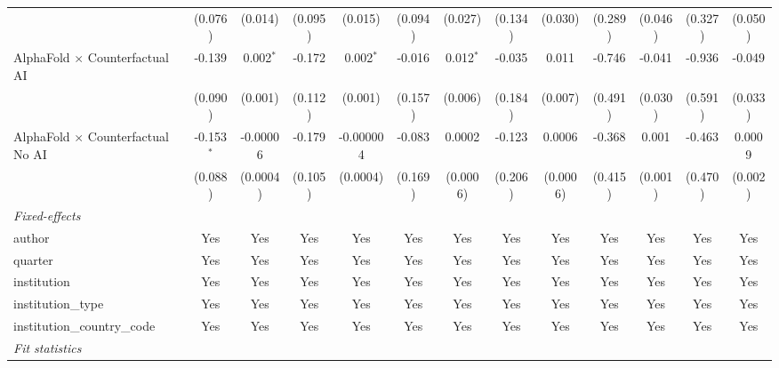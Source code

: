 \begin{tabular}{lcccccccccccc}
                                            & (0.076)      & (0.014)     & (0.095)      & (0.015)     & (0.094)     & (0.027)     & (0.134)     & (0.030)  & (0.289)      & (0.046) & (0.327)      & (0.050)\\   
   AlphaFold $\times$ Counterfactual AI     & -0.139       & 0.002$^{*}$ & -0.172       & 0.002$^{*}$ & -0.016      & 0.012$^{*}$ & -0.035      & 0.011    & -0.746       & -0.041  & -0.936       & -0.049\\   
                                            & (0.090)      & (0.001)     & (0.112)      & (0.001)     & (0.157)     & (0.006)     & (0.184)     & (0.007)  & (0.491)      & (0.030) & (0.591)      & (0.033)\\   
   AlphaFold $\times$ Counterfactual No AI  & -0.153$^{*}$ & -0.00006    & -0.179       & -0.000004   & -0.083      & 0.0002      & -0.123      & 0.0006   & -0.368       & 0.001   & -0.463       & 0.0009\\   
                                            & (0.088)      & (0.0004)    & (0.105)      & (0.0004)    & (0.169)     & (0.0006)    & (0.206)     & (0.0006) & (0.415)      & (0.001) & (0.470)      & (0.002)\\   
   \midrule
   \emph{Fixed-effects}\\
   author                                   & Yes          & Yes         & Yes          & Yes         & Yes         & Yes         & Yes         & Yes      & Yes          & Yes     & Yes          & Yes\\  
   quarter                                  & Yes          & Yes         & Yes          & Yes         & Yes         & Yes         & Yes         & Yes      & Yes          & Yes     & Yes          & Yes\\  
   institution                              & Yes          & Yes         & Yes          & Yes         & Yes         & Yes         & Yes         & Yes      & Yes          & Yes     & Yes          & Yes\\  
   institution\_type                        & Yes          & Yes         & Yes          & Yes         & Yes         & Yes         & Yes         & Yes      & Yes          & Yes     & Yes          & Yes\\  
   institution\_country\_code               & Yes          & Yes         & Yes          & Yes         & Yes         & Yes         & Yes         & Yes      & Yes          & Yes     & Yes          & Yes\\  
   \midrule
   \emph{Fit statistics}\\

\end{tabular}
